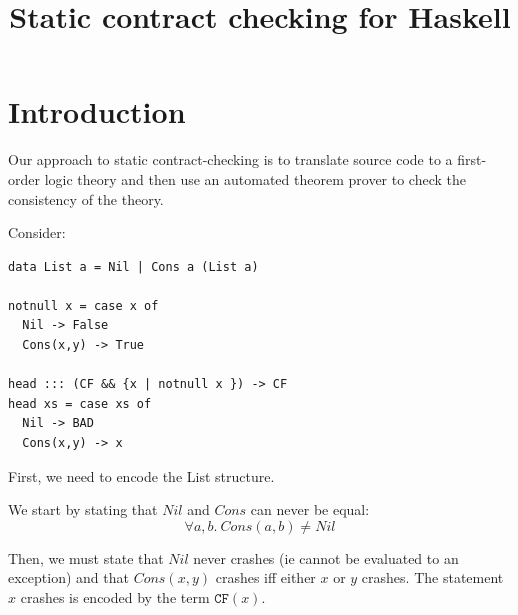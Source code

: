 \documentclass[preprint]{sigplanconf}
\begin{document}
\def\ruleform#1{{\setlength{\fboxrule}{1.2pt}\fbox{\normalsize $#1$}}}
\newcommand{\etrans}[1]{\mathcal{E} \llbracket #1 \rrbracket}
\newcommand{\dtrans}[1]{\mathcal{D} \llbracket #1 \rrbracket}
\newcommand{\ktrans}[1]{\mathcal{K} \llbracket #1 \rrbracket}
\newcommand{\ctrans}[1]{\mathcal{C} \llbracket #1 \rrbracket}
\newcommand{\trans}[1]{\llbracket #1 \rrbracket}

\newcommand{\tot}{\leftrightarrow}

\newtheorem{definition}{Definition}

\newcommand{\unr}{\texttt{UNR}}
\newcommand{\bad}{\texttt{BAD}}
\newcommand{\any}{\texttt{Any}}
\newcommand{\ok}{\texttt{Ok}}
\newcommand{\hprime}{\mathcal{H}'}
\newcommand{\cfc}{\texttt{CF}}
\newcommand{\cf}[1]{\texttt{CF}(#1)}
\newcommand{\weak}[1]{\mbox{$\$$weak}(#1)}
\renewcommand{\min}[1]{\mbox{min}(#1)}


\title{Static contract checking for Haskell}
\maketitle

\section{Introduction}

Our approach to static contract-checking is to translate source code
to a first-order logic theory and then use an automated theorem prover
to check the consistency of the theory.

Consider:
\begin{verbatim}
data List a = Nil | Cons a (List a)

notnull x = case x of
  Nil -> False
  Cons(x,y) -> True

head ::: (CF && {x | notnull x }) -> CF
head xs = case xs of
  Nil -> BAD
  Cons(x,y) -> x
\end{verbatim}

First, we need to encode the List structure. 

We start by stating that $Nil$ and $Cons$ can never be equal:
\begin{equation*}
\forall a,b.~Cons(a,b) \neq Nil
\end{equation*}

Then, we must state that $Nil$ never crashes (ie cannot be evaluated
to an exception) and that $Cons(x,y)$ crashes iff either $x$ or $y$
crashes. The statement $x$ crashes is encoded by the term $\cf{x}$.
\end{document}
